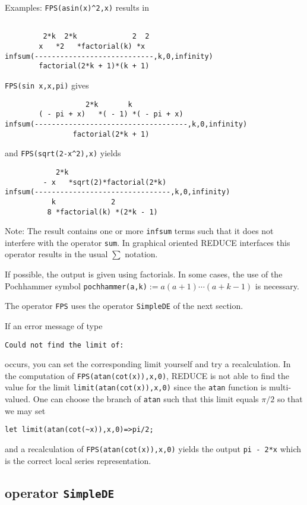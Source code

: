 Examples: {\tt FPS(asin(x)\verb+^+2,x)} results in
\begin{verbatim}

         2*k  2*k             2  2
        x   *2   *factorial(k) *x
infsum(----------------------------,k,0,infinity)
        factorial(2*k + 1)*(k + 1)
\end{verbatim}
{\tt FPS(sin x,x,pi)} gives
\begin{verbatim}
                   2*k       k
        ( - pi + x)   *( - 1) *( - pi + x)
infsum(------------------------------------,k,0,infinity)
                factorial(2*k + 1)
\end{verbatim}
and {\tt FPS(sqrt(2-x\verb+^+2),x)} yields
\begin{verbatim}
            2*k
         - x   *sqrt(2)*factorial(2*k)
infsum(--------------------------------,k,0,infinity)
           k             2
          8 *factorial(k) *(2*k - 1)
\end{verbatim}
Note: The result contains one or more {\tt infsum} terms such that it does
not interfere with the {\REDUCE} operator {\tt sum}. In graphical oriented
REDUCE interfaces this operator results in the usual $\sum$ notation.

If possible, the output is given using factorials. In some cases, the
use of the Pochhammer symbol {\tt pochhammer(a,k)}$:=a(a+1)\cdots(a+k-1)$
is necessary.

The operator {\tt FPS} uses the operator {\tt SimpleDE} of the next section.

If an error message of type
\begin{verbatim}
Could not find the limit of:
\end{verbatim}
occurs, you can set the corresponding limit yourself and try a
recalculation. In the computation of {\tt FPS(atan(cot(x)),x,0)},
REDUCE is not able to find the value for the limit 
{\tt limit(atan(cot(x)),x,0)} since the {\tt atan} function is multi-valued.
One can choose the branch of {\tt atan} such that this limit equals
$\pi/2$ so that we may set 
\begin{verbatim}
let limit(atan(cot(~x)),x,0)=>pi/2;
\end{verbatim}
and a recalculation of {\tt FPS(atan(cot(x)),x,0)}
yields the output {\tt pi - 2*x} which is
the correct local series representation.

\subsection{\REDUCE{} operator {\tt SimpleDE}}

